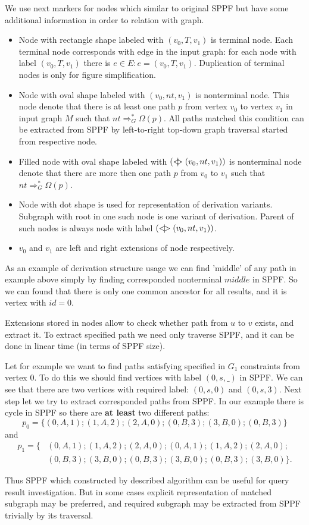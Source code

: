We use next markers for nodes which similar to original SPPF but have some additional information in order to relation with graph.
\begin{itemize}
    \item Node with rectangle shape labeled with $(v_0, T, v_1)$ is terminal node. 
    Each terminal node corresponds with edge in the input graph: for each node with label $(v_0, T, v_1)$ there is $e\in E: e=(v_0,T,v_1)$.
    Duplication of terminal nodes is only for figure simplification.
    \item Node with oval shape labeled with $(v_0, nt, v_1)$ is nonterminal node. 
    This node denote that there is at least one path $p$ from vertex $v_0$ to vertex $v_1$ in input graph $M$ such that $nt \Rightarrow^*_G \Omega(p)$.
    All paths matched this condition can be extracted from SPPF by left-to-right top-down graph traversal started from respective node. 
    \item Filled node with oval shape labeled with $(<\mkern-11mu | \mkern-11mu> (v_0, nt, v_1))$ is nonterminal node denote that there are more then one path $p$ from $v_0$ to $v_1$ such that $nt \Rightarrow^*_G \Omega(p)$.
    \item Node with dot shape is used for representation of derivation variants.
    Subgraph with root in one such node is one variant of derivation.
    Parent of such nodes is always node with label $(<\mkern-9mu | \mkern-9mu> (v_0, nt, v_1))$.
    \item $v_0$ and $v_1$ are left and right extensions of node respectively.
\end{itemize}

As an example of derivation structure usage we can find 'middle' of any path in example above simply by finding corresponded nonterminal $middle$ in SPPF.
So we can found that there is only one common ancestor for all results, and it is vertex with $id = 0$. 

Extensions stored in nodes allow to check whether path from $u$ to $v$ exists, and extract it. 
To extract specified path we need only traverse SPPF, and it can be done in linear time (in terms of SPPF size). 

Let for example we want to find paths satisfying specified in $G_1$ constraints from vertex $0$.
To do this we should find vertices with label $(0, s, \_)$ in SPPF.
We can see that there are two vertices with required label: $(0, s, 0)$ and $(0, s, 3)$.
Next step let we try to extract corresponded paths from SPPF.
In our example there is cycle in SPPF so there are \textbf{at least} two different paths: $$p_0=\{(0,A,1);(1,A,2);(2,A,0);(0,B,3);(3,B,0);(0,B,3)\}$$ and 
\begin{align*}
p_1=\{&(0,A,1);(1,A,2);(2,A,0);(0,A,1);(1,A,2);(2,A,0);\\ &(0,B,3);(3,B,0);(0,B,3);(3,B,0);(0,B,3);(3,B,0)\}.
\end{align*}


Thus SPPF which constructed by described algorithm can be useful for query result investigation. 
But in some cases explicit representation of matched subgraph may be preferred, and required subgraph may be extracted from SPPF trivially by its traversal.
